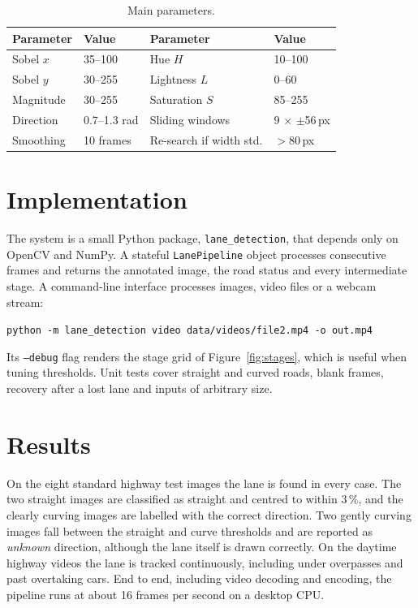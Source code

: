 \documentclass[11pt,a4paper]{article}
\begin{document}
\begin{table}[t]
  \centering
  \small
  \begin{tabular}{@{}ll@{\qquad}ll@{}}
    \toprule
    Parameter & Value & Parameter & Value \\
    \midrule
    Sobel $x$ & 35--100 & Hue $H$ & 10--100 \\
    Sobel $y$ & 30--255 & Lightness $L$ & 0--60 \\
    Magnitude & 30--255 & Saturation $S$ & 85--255 \\
    Direction & 0.7--1.3 rad & Sliding windows & 9 $\times$ $\pm$56\,px \\
    Smoothing & 10 frames & Re-search if width std. & $>80$\,px \\
    \bottomrule
  \end{tabular}
  \caption{Main parameters.}
  \label{tab:params}
\end{table}

\section{Implementation}
The system is a small Python package, \texttt{lane\_detection}, that depends only on
OpenCV and NumPy. A stateful \texttt{LanePipeline} object processes consecutive frames and
returns the annotated image, the road status and every intermediate stage. A command-line
interface processes images, video files or a webcam stream:
\begin{center}
\texttt{python -m lane\_detection video data/videos/file2.mp4 -o out.mp4}
\end{center}
Its \texttt{--debug} flag renders the stage grid of Figure~\ref{fig:stages}, which is
useful when tuning thresholds. Unit tests cover straight and curved roads, blank frames,
recovery after a lost lane and inputs of arbitrary size.

\section{Results}
On the eight standard highway test images the lane is found in every case. The two
straight images are classified as straight and centred to within 3\,\%, and the clearly
curving images are labelled with the correct direction. Two gently curving images fall
between the straight and curve thresholds and are reported as \emph{unknown} direction,
although the lane itself is drawn correctly. On the daytime highway videos the lane is
tracked continuously, including under overpasses and past overtaking cars. End to end,
including video decoding and encoding, the pipeline runs at about 16 frames per second on
a desktop CPU.
\end{document}
